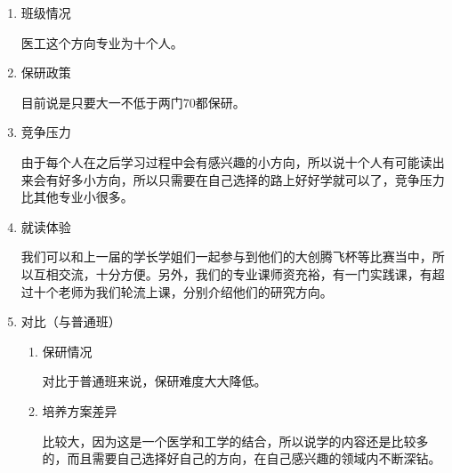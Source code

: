 \documentclass[zihao=-4,fontset=none]{Beautybook-CN}
\begin{document}
\begin{enumerate}
			
	\item 班级情况
	      	      	      
	      医工这个方向专业为十个人。
	      	      	      
	\item 保研政策
	      	      	      
	      目前说是只要大一不低于两门70都保研。
	      	      	      
	\item 竞争压力
	      	      	      
	      由于每个人在之后学习过程中会有感兴趣的小方向，所以说十个人有可能读出来会有好多小方向，所以只需要在自己选择的路上好好学就可以了，竞争压力比其他专业小很多。
	      	      	      
	\item 就读体验
	      	      	      
	      我们可以和上一届的学长学姐们一起参与到他们的大创腾飞杯等比赛当中，所以互相交流，十分方便。另外，我们的专业课师资充裕，有一门实践课，有超过十个老师为我们轮流上课，分别介绍他们的研究方向。
	      	      	      
	\item 对比（与普通班）
	      	      	      
	      \begin{enumerate}
	      	\item 保研情况
	      	      	      	      	      	      
	      	      对比于普通班来说，保研难度大大降低。
	      	      	      	      	      	      
	      	\item 培养方案差异
	      	      	      	      	      	      
	      	      比较大，因为这是一个医学和工学的结合，所以说学的内容还是比较多的，而且需要自己选择好自己的方向，在自己感兴趣的领域内不断深钻。
	      \end{enumerate}
\end{enumerate}
\end{document}
